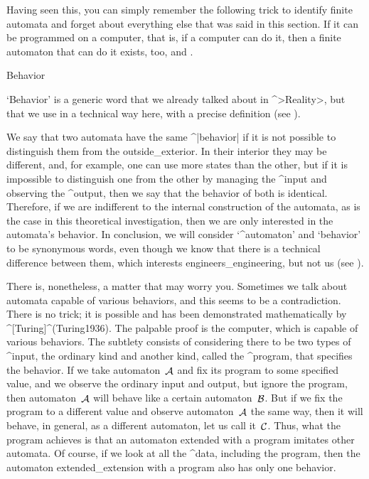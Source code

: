 Having seen this, you can simply remember the following trick to
identify finite automata and forget about everything else that was said
in this section. If it can be programmed on a computer, that is, if a
computer can do it, then a finite automaton that can do it exists, too,
and .


\Section Behavior

`Behavior' is a generic word that we already talked about in ^>Reality>,
but that we use in a technical way here, with a precise definition (see
).

We say that two automata have the same ^|behavior| if it is not possible
to distinguish them from the outside_{exterior}. In their interior they
may be different, and, for example, one can use more states than the
other, but if it is impossible to distinguish one from the other by
managing the ^{input} and observing the ^{output}, then we say that the
behavior of both is identical. Therefore, if we are indifferent to the
internal construction of the automata, as is the case in this
theoretical investigation, then we are only interested in the automata's
behavior. In conclusion, we will consider `^{automaton}' and `behavior'
to be synonymous words, even though we know that there is a technical
difference between them, which interests engineers_{engineering}, but
not us (see ).

There is, nonetheless, a matter that may worry you. %
Sometimes we talk about automata capable of various behaviors, and this
seems to be a contradiction. There is no trick; it is possible and has
been demonstrated mathematically by ^[Turing]^(Turing1936). The palpable
proof is the computer, which is capable of various behaviors. The
subtlety consists of considering there to be two types of ^{input}, the
ordinary kind and another kind, called the ^{program}, that specifies
the behavior. If we take automaton~$\aut A$ and fix its program to some
specified value, and we observe the ordinary input and output, but
ignore the program, then automaton~$\aut A$ will behave like a certain
automaton~$\aut B$. But if we fix the program to a different value and
observe automaton~$\aut A$ the same way, then it will behave, in
general, as a different automaton, let us call it~$\aut C$. Thus, what
the program achieves is that an automaton extended with a program
imitates other automata. Of course, if we look at all the ^{data},
including the program, then the automaton extended_{extension} with a
program also has only one behavior.


\endinput
